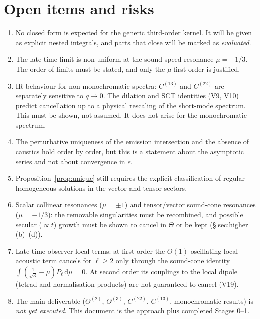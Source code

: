 \documentclass[11pt]{article}
\theoremstyle{definition}
\theoremstyle{remark}
\newcommand{\eps}{\epsilon}
\newcommand{\dd}{\mathrm{d}}
\begin{document}
\section{Open items and risks}\label{sec:open}
\begin{enumerate}
\item No closed form is expected for the generic third-order kernel. It
will be given as explicit nested integrals, and parts that close will be
marked as \emph{evaluated}.
\item The late-time limit is non-uniform at the sound-speed resonance
$\mu=-1/3$. The order of limits must be stated, and only the $\mu$-first
order is justified.
\item IR behaviour for non-monochromatic spectra: $C^{(13)}$ and $C^{(22)}$
are separately sensitive to $q\to0$. The dilation and SCT identities
(V9, V10) predict cancellation up to a physical rescaling of the short-mode
spectrum. This must be shown, not assumed. It does not arise for the
monochromatic spectrum.
\item The perturbative uniqueness of the emission intersection and the
absence of caustics hold order by order, but this is a statement about the
asymptotic series and not about convergence in $\eps$.
\item Proposition~\ref{prop:unique} still requires the explicit
classification of regular homogeneous solutions in the vector and tensor
sectors.
\item Scalar collinear resonances ($\mu=\pm1$) and tensor/vector sound-cone
resonances ($\mu=-1/3$): the removable singularities must be recombined, and
possible secular ($\propto t$) growth must be shown to cancel in $\Theta$ or
be kept (\S\ref{sec:higher}(b)--(d)).
\item Late-time observer-local terms: at first order the $O(1)$ oscillating
local acoustic term cancels for $\ell\ge2$ only through the sound-cone
identity $\int(\tfrac1{\sqrt3}-\mu)P_\ell\,\dd\mu=0$. At second order its
couplings to the local dipole (tetrad and normalisation products) are not
guaranteed to cancel (V19).
\item The main deliverable ($\Theta^{(2)}$, $\Theta^{(3)}$, $C^{(22)}$,
$C^{(13)}$, monochromatic results) is \emph{not yet executed}. This document
is the approach plus completed Stages 0--1.
\end{enumerate}
\end{document}
